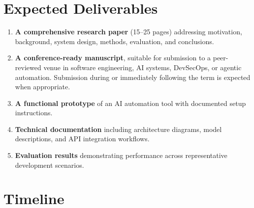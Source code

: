 \documentclass[11pt]{article}
\begin{document}
\section*{Expected Deliverables}

\begin{enumerate}
    \item \textbf{A comprehensive research paper} (15--25 pages) addressing motivation, background, system design, methods, evaluation, and conclusions.
    \item \textbf{A conference-ready manuscript}, suitable for submission to a peer-reviewed venue in software engineering, AI systems, DevSecOps, or agentic automation. Submission during or immediately following the term is expected when appropriate.
    \item \textbf{A functional prototype} of an AI automation tool with documented setup instructions.
    \item \textbf{Technical documentation} including architecture diagrams, model descriptions, and API integration workflows.
    \item \textbf{Evaluation results} demonstrating performance across representative development scenarios.
\end{enumerate}




\section*{Timeline}
\end{document}
